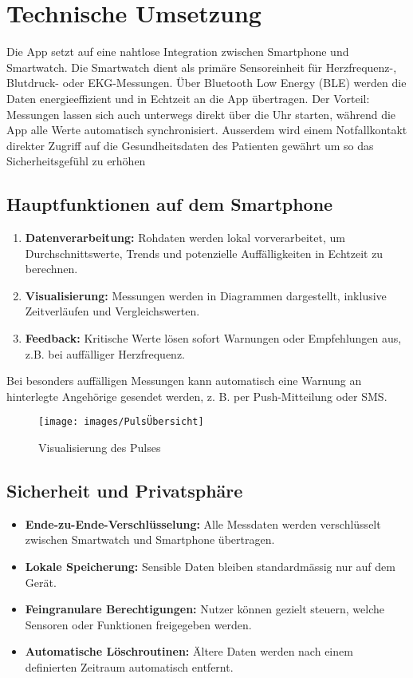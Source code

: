 \section{Technische Umsetzung}
Die App setzt auf eine nahtlose Integration zwischen Smartphone und Smartwatch. Die Smartwatch dient als primäre Sensoreinheit für Herzfrequenz-, Blutdruck- oder EKG-Messungen. Über Bluetooth Low Energy (BLE) werden die Daten energieeffizient und in Echtzeit an die App übertragen.
Der Vorteil: Messungen lassen sich auch unterwegs direkt über die Uhr starten, während die App alle Werte automatisch synchronisiert. Ausserdem wird einem Notfallkontakt direkter Zugriff auf die Gesundheitsdaten des Patienten gewährt um so das Sicherheitsgefühl zu erhöhen

\subsection{Hauptfunktionen auf dem Smartphone}
\begin{enumerate}
	\item \textbf{Datenverarbeitung:} 
	Rohdaten werden lokal vorverarbeitet, um Durchschnittswerte, Trends und 
	potenzielle Auffälligkeiten in Echtzeit zu berechnen.
	\item \textbf{Visualisierung:} 
	Messungen werden in Diagrammen dargestellt, inklusive Zeitverläufen und 
	Vergleichswerten.
	\item \textbf{Feedback:} 
	Kritische Werte lösen sofort Warnungen oder Empfehlungen aus, 
	z.B. bei auffälliger Herzfrequenz.
\end{enumerate}

Bei besonders auffälligen Messungen kann automatisch eine Warnung an hinterlegte Angehörige gesendet werden, z. B. per Push-Mitteilung oder SMS.

\begin{figure}[h!]
	\centering
	\texttt{[image: images/PulsÜbersicht]}
	\caption{Visualisierung des Pulses}
	\label{fig:pulsubersicht}
\end{figure}

\subsection{Sicherheit und Privatsphäre}
\begin{itemize}
	\item \textbf{Ende-zu-Ende-Verschlüsselung:} 
	Alle Messdaten werden verschlüsselt zwischen Smartwatch und Smartphone übertragen.
	\item \textbf{Lokale Speicherung:} 
	Sensible Daten bleiben standardmässig nur auf dem Gerät.
	\item \textbf{Feingranulare Berechtigungen:} 
	Nutzer können gezielt steuern, welche Sensoren oder Funktionen freigegeben werden.
	\item \textbf{Automatische Löschroutinen:} 
	Ältere Daten werden nach einem definierten Zeitraum automatisch entfernt.
\end{itemize}

